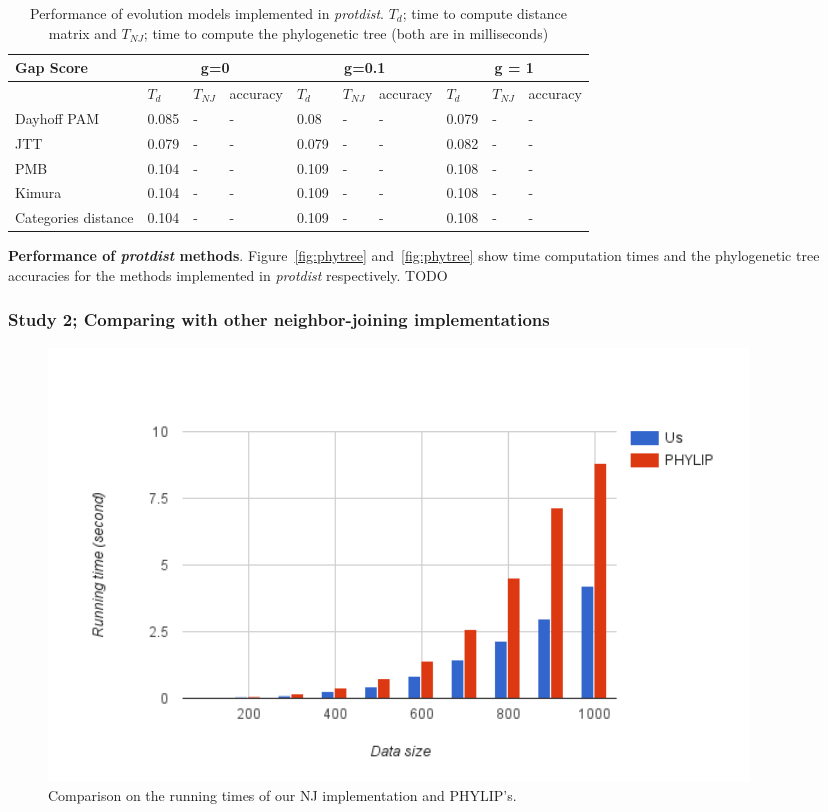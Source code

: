\documentclass[11pt,letterpaper]{article}
\theoremstyle{definition}
\begin{document}
\begin{table}[!h]
\centering
	\begin{tabular}{l|lll|lll|lll}

Gap Score	& \multicolumn{3}{c}{g=0} & \multicolumn{3}{c}{g=0.1} &  \multicolumn{3}{c}{g = 1} \\
\hline
&	$T_d$	& $T_{NJ}$	& accuracy &	$T_d$	& $T_{NJ}$	& accuracy &	$T_d$	& $T_{NJ}$	& accuracy \\
\hline
Dayhoff PAM		&	0.085	&	-	&	-	&	0.08	&	-	&	-	&	0.079	&	-	&	-	\\
JTT	&	0.079	&	-	&	-	&	0.079	&	-	&	-	&	0.082	&	-	&	-	\\
PMB	&	0.104	&	-	&	-	&	0.109	&	-	&	-	&	0.108	&	-	&	-	\\
Kimura	&	0.104	&	-	&	-	&	0.109	&	-	&	-	&	0.108	&	-	&	-	\\
Categories distance	&	0.104	&	-	&	-	&	0.109	&	-	&	-	&	0.108	&	-	&	-	\\
\hline
\end{tabular}
\caption{Performance of evolution models implemented in \textit{protdist}. 
$T_d$; time to compute distance matrix and $T_{NJ}$; time to compute the phylogenetic tree (both are in milliseconds)}\label{tab:dist1}
\end{table}

\textbf{Performance of \textit{protdist} methods}. Figure~\ref{fig:phytree} and~\ref{fig:phytree} show time computation times and the phylogenetic tree accuracies for the methods implemented in \textit{protdist} respectively. TODO 

\subsubsection{Study 2; Comparing with other neighbor-joining implementations}

\begin{figure}[t]
  \centering
  \includegraphics[width=0.9\textwidth]{runningtime.png}
  \caption{Comparison on the running times of our NJ implementation and PHYLIP's.}
  \label{fig:runningtime}
\end{figure}
\end{document}
